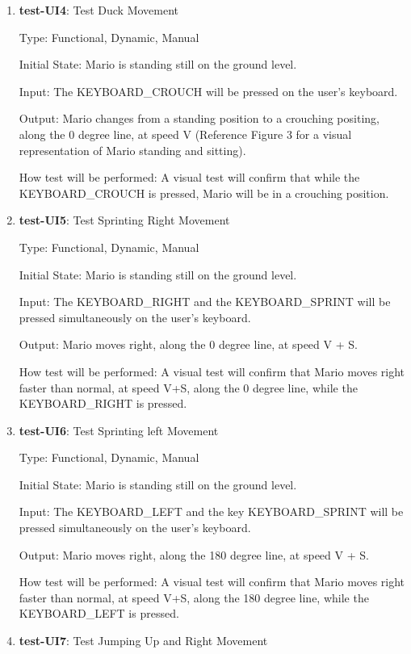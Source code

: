 \documentclass[12pt, titlepage]{article}
\begin{document}
\begin{enumerate}
\item{\textbf{test-UI4}: Test Duck Movement\\}

Type: Functional, Dynamic, Manual
					
Initial State: Mario is standing still on the ground level.
					
Input: The KEYBOARD\_CROUCH will be pressed on the user's keyboard.
					
Output: Mario changes from a standing position to a crouching positing, along the 0 degree line, at speed V (Reference Figure 3 for a visual representation of Mario standing and sitting).
					
How test will be performed: A visual test will confirm that while the KEYBOARD\_CROUCH is pressed, Mario will be in a crouching position.

\item{\textbf{test-UI5}: Test Sprinting Right Movement\\}

Type: Functional, Dynamic, Manual
					
Initial State: Mario is standing still on the ground level.
					
Input: The KEYBOARD\_RIGHT and the KEYBOARD\_SPRINT will be pressed simultaneously on the user's keyboard.
					
Output: Mario moves right, along the 0 degree line, at speed V + S.
					
How test will be performed: A visual test will confirm that Mario moves right faster than normal, at speed V+S, along the 0 degree line, while the KEYBOARD\_RIGHT is pressed.

\item{\textbf{test-UI6}: Test Sprinting left Movement\\}

Type: Functional, Dynamic, Manual
					
Initial State: Mario is standing still on the ground level.
					
Input: The KEYBOARD\_LEFT and the key KEYBOARD\_SPRINT will be pressed simultaneously on the user's keyboard.
					
Output: Mario moves right, along the 180 degree line, at speed V + S.
					
How test will be performed: A visual test will confirm that Mario moves right faster than normal, at speed V+S, along the 180 degree line, while the KEYBOARD\_LEFT is pressed.

\item{\textbf{test-UI7}: Test Jumping Up and Right Movement\\}


\end{enumerate}
\end{document}
